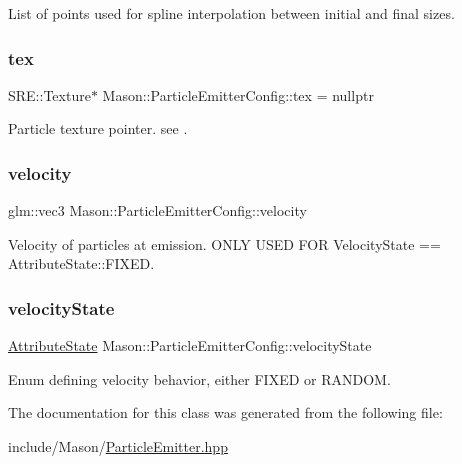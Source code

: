 List of points used for spline interpolation between initial and final sizes. 

\hypertarget{struct_mason_1_1_particle_emitter_config_a660e9a7613b158ac36bfc4ffe8b5f610}{}\label{struct_mason_1_1_particle_emitter_config_a660e9a7613b158ac36bfc4ffe8b5f610} 
\subsubsection{\texorpdfstring{tex}{tex}}
{\footnotesize\ttfamily S\+R\+E\+::\+Texture$\ast$ Mason\+::\+Particle\+Emitter\+Config\+::tex = nullptr}



Particle texture pointer. see . 

\hypertarget{struct_mason_1_1_particle_emitter_config_af8c3efa305e0a0636576bebe60938c80}{}\label{struct_mason_1_1_particle_emitter_config_af8c3efa305e0a0636576bebe60938c80} 
\subsubsection{\texorpdfstring{velocity}{velocity}}
{\footnotesize\ttfamily glm\+::vec3 Mason\+::\+Particle\+Emitter\+Config\+::velocity}



Velocity of particles at emission. O\+N\+LY U\+S\+ED F\+OR Velocity\+State == Attribute\+State\+::\+F\+I\+X\+ED. 

\hypertarget{struct_mason_1_1_particle_emitter_config_a449a7ec64ad8d9f9be405f1beb5ee507}{}\label{struct_mason_1_1_particle_emitter_config_a449a7ec64ad8d9f9be405f1beb5ee507} 
\subsubsection{\texorpdfstring{velocity\+State}{velocityState}}
{\footnotesize\ttfamily \hyperlink{namespace_mason_aefc2ce7d9295b57af46ab6c8ebfc32f7}{Attribute\+State} Mason\+::\+Particle\+Emitter\+Config\+::velocity\+State}



Enum defining velocity behavior, either F\+I\+X\+ED or R\+A\+N\+D\+OM. 



The documentation for this class was generated from the following file\+:\begin{DoxyCompactItemize}
\item 
include/\+Mason/\hyperlink{_particle_emitter_8hpp}{Particle\+Emitter.\+hpp}\end{DoxyCompactItemize}
